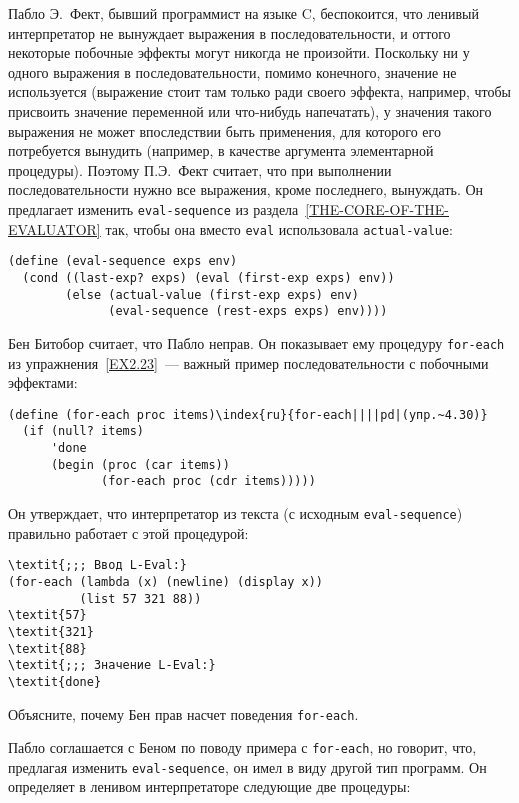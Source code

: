 \begin{exercise}{4.30}%
\label{EX4.30}%
Пабло Э.~Фект, бывший программист на языке C, беспокоится,
что ленивый интерпретатор не вынуждает выражения в
последовательности, и оттого некоторые побочные эффекты могут никогда не
произойти.  Поскольку ни у одного выражения в последовательности,
помимо конечного, значение не используется (выражение стоит там только ради
своего эффекта, например, чтобы присвоить значение переменной или
что-нибудь напечатать),
у значения такого выражения не может впоследствии быть применения, для
которого его потребуется вынудить (например, в качестве
аргумента элементарной процедуры).
Поэтому П.Э.~Фект считает, что при выполнении последовательности нужно
все выражения, кроме последнего, вынуждать.  Он предлагает изменить
{\tt eval-sequence} из  раздела~\ref{THE-CORE-OF-THE-EVALUATOR} так,
чтобы она  вместо {\tt eval} использовала {\tt actual-value}:

\begin{Verbatim}[fontsize=\small]
(define (eval-sequence exps env)
  (cond ((last-exp? exps) (eval (first-exp exps) env))
        (else (actual-value (first-exp exps) env)
              (eval-sequence (rest-exps exps) env))))
\end{Verbatim}

\begin{plainenum}
\item

Бен Битобор считает, что Пабло неправ.  Он
показывает ему процедуру {\tt for-each} из 
упражнения~\ref{EX2.23}~--- важный пример последовательности с побочными
эффектами:

\begin{Verbatim}[fontsize=\small]
(define (for-each proc items)\index{ru}{for-each||||pd|(упр.~4.30)}
  (if (null? items)
      'done
      (begin (proc (car items))
             (for-each proc (cdr items)))))
\end{Verbatim}
Он утверждает, что интерпретатор из текста (с исходным
{\tt eval-sequence}) правильно работает с этой процедурой:

\begin{Verbatim}[fontsize=\small]
\textit{;;; Ввод L-Eval:}
(for-each (lambda (x) (newline) (display x))
          (list 57 321 88))
\textit{57}
\textit{321}
\textit{88}
\textit{;;; Значение L-Eval:}
\textit{done}
\end{Verbatim}
Объясните, почему Бен прав насчет поведения {\tt for-each}.

\item
Пабло соглашается с Беном по поводу примера с
{\tt for-each}, но говорит, что, предлагая
изменить {\tt eval-sequence}, он имел в виду другой тип
программ.  Он определяет в ленивом интерпретаторе следующие две
процедуры:


\end{plainenum}
\end{exercise}
